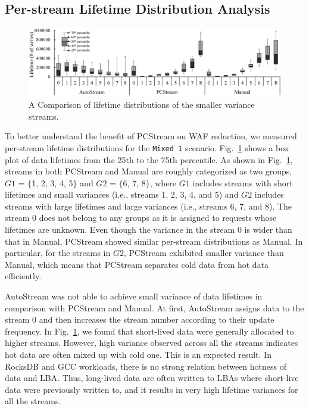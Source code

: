 \subsection{Per-stream Lifetime Distribution Analysis}

\begin{figure}[t]
	\centering
	\includegraphics[width=1\linewidth]{figure/distribution}
	\caption{A Comparison of lifetime distributions of the smaller variance streams.}
	\label{fig:distribution}
\end{figure}

To better understand the benefit of \textsf{\small PCStream} on WAF reduction,
we measured per-stream lifetime distributions for the \texttt{Mixed 1}
scenario.  Fig.~\ref{fig:distribution} shows a box plot of data lifetimes from
the 25th to the 75th percentile.  As shown in Fig.~\ref{fig:distribution},
streams in both \textsf{\small PCStream} and Manual are roughly categorized as
two groups, $G1$ = $\{$1, 2, 3, 4, 5$\}$ and $G2$ = $\{$6, 7, 8$\}$, where $G1$
includes streams with short lifetimes and small variances (i.e., streams 1, 2,
3, 4, and 5) and $G2$ includes streams with large lifetimes and large variances
(i.e., streams 6, 7, and 8). The stream 0 does not belong to any groups as it
is assigned to requests whose lifetimes are unknown.  Even though the variance
in the stream 0 is wider than that in Manual, PCStream showed similar
per-stream distributions as Manual. In particular, for the streams in $G2$,
PCStream exhibited smaller variance than Manual, which means that PCStream
separates cold data from hot data efficiently.

AutoStream was not able to achieve small variance of data lifetimes in
comparison with PCStream and Manual. At first, AutoStream assigns data to the
stream 0 and then increases the stream number according to their update
frequency. In Fig.~\ref{fig:distribution}, we found that short-lived data were
generally allocated to higher streams.  However, high variance observed across
all the streams indicates hot data are often mixed up with cold one.  This is
an expected result. In RocksDB and GCC workloads, there is no strong relation
between hotness of data and LBA.  Thus, long-lived data are often written to
LBAs where short-live data were previously written to, and it results in very
high lifetime variances for all the streams.

